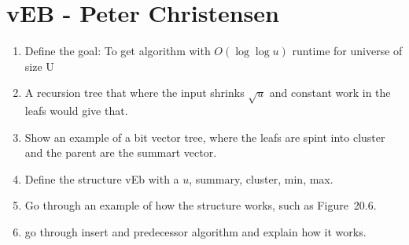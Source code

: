 \section*{vEB - Peter Christensen}

\begin{enumerate}
	\item Define the goal: To get algorithm with $O(\log\log u)$ runtime for universe of size U
	\item A recursion tree that where the input shrinks $\sqrt{u}$ and constant work in the leafs would give that.
	\item Show an example of a bit vector tree, where the leafs are spint into cluster and the parent are the summart vector.
	\item Define the structure vEb with a $u$, summary, cluster, min, max.
	\item Go through an example of how the structure works, such as Figure~20.6.
	\item go through insert and predecessor algorithm and explain how it works.
\end{enumerate}